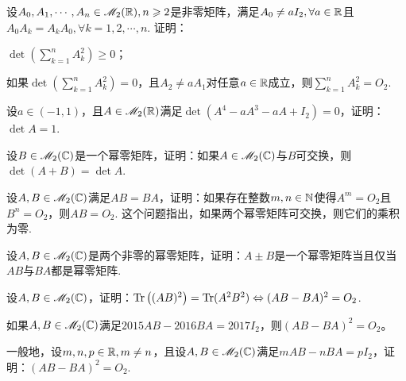 \begin{problem}
  设$A_0,A_1,\cdots,A_n\in\mathscr M_2(\mathbb R),n\geqslant2$是非零矩阵，满足$A_0\ne aI_2,\forall a\in\mathbb R$且$A_0A_k=A_kA_0,\forall k=1,2,\cdots,n$. 证明：
  \begin{enum}
    \item $\det\left(\sum_{k=1}^nA_k^2\right)
        \ge0$；
    \item 如果$\det\left(\sum_{k=1}^nA_k^2\right) =0$，且$A_2\ne aA_1$对任意$a\in\mathbb R$成立，则$\sum_{k=1}^nA_k^2=O_2$.
  \end{enum}
\end{problem}

\begin{problem}
  设$a\in(-1,1)$，且$A\in\mathscr M_2(\mathbb R)$满足$\det(A^4-aA^3-aA+I_2)=0$，证明：$\det A=1$.
\end{problem}

\begin{problem}
  设$B\in\mathscr M_2(\mathbb C)$是一个幂零矩阵，证明：如果$A\in\mathscr M_2(\mathbb C)$与$B$可交换，则$\det(A+B)=\det A$.
\end{problem}

\begin{problem}
  设$A,B\in\mathscr M_2(\mathbb C)$满足$AB=BA$，证明：如果存在整数$m,n\in\mathbb N$使得$A^m=O_2$且$B^n=O_2$，则$AB=O_2$. 这个问题指出，{\kaishu 如果两个幂零矩阵可交换，则它们的乘积为零.}
\end{problem}

\begin{problem}

  设$A,B\in\mathscr M_2(\mathbb C)$是两个非零的幂零矩阵，证明：$A\pm B$是一个幂零矩阵当且仅当$AB$与$BA$都是幂零矩阵.
\end{problem}

\begin{problem}
  设$A,B\in\mathscr M_2(\mathbb C)$，证明：$\operatorname{Tr}\big((AB)^2\big)
  =\operatorname{Tr}(A^2B^2)\Leftrightarrow (AB-BA)^2=O_2$.
\end{problem}

\begin{problem}
  \begin{enum}
    \item \cite{28} 如果$A,B\in\mathscr M_2(\mathbb C)$满足$2015AB-2016BA=2017I_2$，则$(AB-BA)^2=O_2$。
    \item 一般地，设$m,n,p\in\mathbb R,m\ne n$，且设$A,B\in\mathscr M_2(\mathbb C)$满足$mAB-nBA=pI_2$，证明：$(AB-BA)^2=O_2$.
  \end{enum}
\end{problem}

